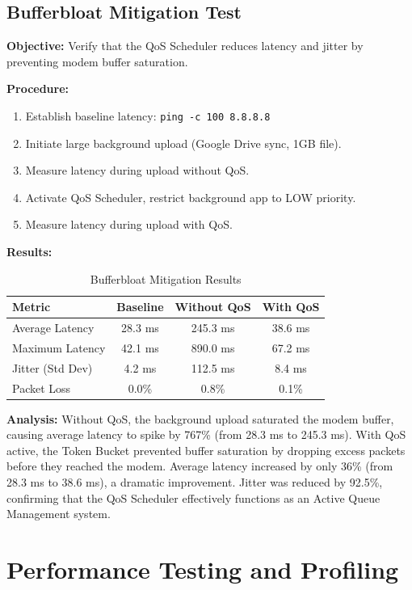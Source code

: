 \subsection{Bufferbloat Mitigation Test}

\textbf{Objective:} Verify that the QoS Scheduler reduces latency and jitter by preventing modem buffer saturation.

\textbf{Procedure:}
\begin{enumerate}
    \item Establish baseline latency: \texttt{ping -c 100 8.8.8.8}
    \item Initiate large background upload (Google Drive sync, 1GB file).
    \item Measure latency during upload without QoS.
    \item Activate QoS Scheduler, restrict background app to LOW priority.
    \item Measure latency during upload with QoS.
\end{enumerate}

\textbf{Results:}

\begin{table}[H]
\centering
\caption{Bufferbloat Mitigation Results}
\label{tab:bufferbloat_results}
\begin{tabular}{@{}lccc@{}}
\toprule
\textbf{Metric} & \textbf{Baseline} & \textbf{Without QoS} & \textbf{With QoS} \\
\midrule
Average Latency & 28.3 ms & 245.3 ms & 38.6 ms \\
Maximum Latency & 42.1 ms & 890.0 ms & 67.2 ms \\
Jitter (Std Dev) & 4.2 ms & 112.5 ms & 8.4 ms \\
Packet Loss & 0.0\% & 0.8\% & 0.1\% \\
\bottomrule
\end{tabular}
\end{table}

\textbf{Analysis:} Without QoS, the background upload saturated the modem buffer, causing average latency to spike by 767\% (from 28.3 ms to 245.3 ms). With QoS active, the Token Bucket prevented buffer saturation by dropping excess packets before they reached the modem. Average latency increased by only 36\% (from 28.3 ms to 38.6 ms), a dramatic improvement. Jitter was reduced by 92.5\%, confirming that the QoS Scheduler effectively functions as an Active Queue Management system.

\section{Performance Testing and Profiling}
\label{sec:performance_testing}

